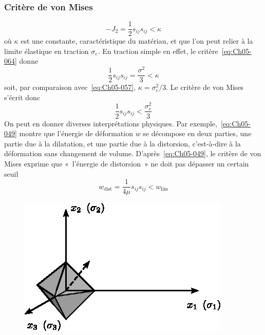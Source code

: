 \subsubsection{Critère de von Mises}
\begin{equation}
    -J_2 = \frac{1}{2} s_{ij} s_{ij} < \kappa
    \label{eq:Ch05-064}
\end{equation}
où $\kappa$ est une constante, caractéristique du matériau, et que l'on peut relier à la limite élastique en traction $\sigma_e$.
En traction simple en effet, le critère~\eqref{eq:Ch05-064} donne 
\begin{equation*}
    \frac{1}{2} s_{ij} s_{ij} = \frac{\sigma^2}{3} < \kappa
\end{equation*}
soit, par comparaison avec~\eqref{eq:Ch05-057}, $\kappa = \sigma_e^2/3$.
Le critère de von Mises s'écrit donc 
\begin{equation}
    \frac{1}{2} s_{ij} s_{ij} < \frac{\sigma_e^2}{3}
    \label{eq:Ch05-065}
\end{equation}
On peut en donner diverses interprétations physiques.
Par exemple,~\eqref{eq:Ch05-049} montre que l'énergie de déformation $w$ se décompose en deux parties, une partie due à la dilatation, et une partie due à la distorsion, c'est-à-dire à la déformation sans changement de volume.
D'après~\eqref{eq:Ch05-049}, le critère de von Mises exprime que «~l'énergie de distorsion~» ne doit pas dépasser un certain seuil 
\begin{equation}
    w_{\mathrm{dist}} = \frac{1}{4\mu} s_{ij} s_{ij} < w_{\mathrm{lim}}
    \label{eq:Ch05-065b}
\end{equation}
\begin{figure}
    \begin{center}
        \includegraphics{../images/T1_Ch05-04}
    \end{center}
\end{figure}
